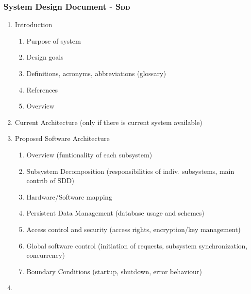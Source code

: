 \documentclass[a4paper, 10pt]{article}
\begin{document}
\subsubsection{System Design Document - \textsc{Sdd}}
\begin{enumerate}
	\item Introduction
	\begin{enumerate}
		\item Purpose of system
		\item Design goals
		\item Definitions, acronyms, abbreviations (glossary)
		\item References
		\item Overview
	\end{enumerate}
	\item Current Architecture (only if there is current system available)
	\item Proposed Software Architecture
	\begin{enumerate}
		\item Overview (funtionality of each subsystem)
		\item Subsystem Decomposition (responsibilities of indiv. subsystems, main contrib of SDD)
		\item Hardware/Software mapping
		\item Persistent Data Management (database usage and schemes)
		\item Access control and security (access rights, encryption/key management)
		\item Global software control (initiation of requests, subsystem synchronization, concurrency)
		\item Boundary Conditions (startup, shutdown, error behaviour)
	\end{enumerate}
	\item 
\end{enumerate}
\end{document}
